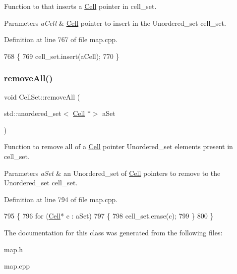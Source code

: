 Function to that inserts a \hyperlink{class_cell}{Cell} pointer in cell\+\_\+set. 


\begin{DoxyParams}{Parameters}
{\em a\+Cell} & \hyperlink{class_cell}{Cell} pointer to insert in the Unordered\+\_\+set cell\+\_\+set. \\
\hline
\end{DoxyParams}


Definition at line 767 of file map.\+cpp.


\begin{DoxyCode}
768 \{
769     cell\_set.insert(aCell);
770 \}
\end{DoxyCode}
\hypertarget{class_cell_set_a13671e16ec2d31a9d5ae628f0df87890}{}\label{class_cell_set_a13671e16ec2d31a9d5ae628f0df87890} 
\subsubsection{\texorpdfstring{remove\+All()}{removeAll()}}
{\footnotesize\ttfamily void Cell\+Set\+::remove\+All (\begin{DoxyParamCaption}\item[{std\+::unordered\+\_\+set$<$ \hyperlink{class_cell}{Cell} $\ast$$>$}]{a\+Set }\end{DoxyParamCaption})}



Function to remove all of a \hyperlink{class_cell}{Cell} pointer Unordered\+\_\+set elements present in cell\+\_\+set. 


\begin{DoxyParams}{Parameters}
{\em a\+Set} & an Unordered\+\_\+set of \hyperlink{class_cell}{Cell} pointers to remove to the Unordered\+\_\+set cell\+\_\+set. \\
\hline
\end{DoxyParams}


Definition at line 794 of file map.\+cpp.


\begin{DoxyCode}
795 \{
796     \textcolor{keywordflow}{for} (\hyperlink{class_cell}{Cell}* c : aSet)
797     \{
798         cell\_set.erase(c);
799     \}
800 \}
\end{DoxyCode}


The documentation for this class was generated from the following files\+:\begin{DoxyCompactItemize}
\item 
map.\+h\item 
map.\+cpp\end{DoxyCompactItemize}
